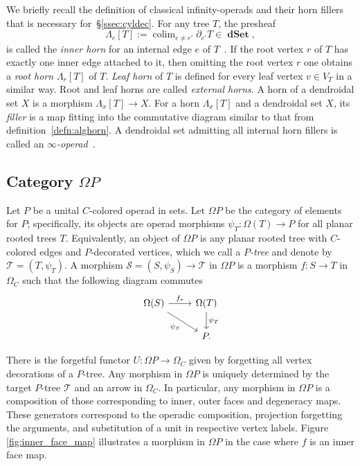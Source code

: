 \documentclass{amsart}
\theoremstyle{definition}
\theoremstyle{remark}
\DeclareMathOperator{\col}{colim}
\DeclareMathOperator{\dset}{\mathbf{dSet}}
\begin{document}
	We briefly recall the definition of classical infinity-operads and their horn fillers that is necessary for~\S\ref{ssec:cyldec}.
	For any tree $T$, the presheaf
	\begin{equation}\label{eq:colhornd}
		\Lambda_{e}[T]:=\col_{e\neq e'} \partial_{e'} T\in \dset,
	\end{equation}
	is called the \textit{inner horn} for an internal edge $e$ of $T$~\cite[\S 6]{he-mo-22}.
	If the root vertex $r$ of $T$ has exactly one inner edge attached to it, then omitting the root vertex $r$ one obtains a \textit{root horn} $\Lambda_{r} [T]$ of $T$.
	\textit{Leaf horn} of $T$ is defined for every leaf vertex $v\in V_T$ in a similar way.
	Root and leaf horns are called \textit{external horns}.
	A horn of a dendroidal set $X$ is a morphism $\Lambda_{x}[T]\to X$.
	For a horn $\Lambda_{x}[T]$ and a dendroidal set $X$, its \textit{filler} is a map fitting into the commutative diagram similar to that from definition~\ref{defn:alghorn}.
	A dendroidal set admitting all internal horn fillers is called an \textit{$\infty$-operad}~\cite{we-07}.

	\subsection{Category $\Omega P$}\label{ssec:ptrees}
	Let $P$ be a unital $C$-colored operad in sets.
	Let $\Omega P$ be the category of elements for $P$; specifically, its
	objects are operad morphisms $\psi_{T}\colon \Omega(T)\to P$ for all planar rooted trees $T$.
	Equivalently, an object of $\Omega P$ is any planar rooted tree with $C$-colored edges and $P$-decorated vertices, which we call a \emph{$P$-tree} and denote by $\mathcal{T}=(T,\psi_{T})$.
	A morphism $\mathcal{S}=(S,\psi_{S})\to\mathcal{T}$ in $\Omega P$ is a morphism $f\colon S\to T$ in $\Omega_{C}$ such that the following diagram commutes
	\begin{equation}
		\begin{tikzcd}
			\Omega(S) \arrow{r}{f_{*}}\arrow[swap]{rd}{\psi_{S}} & \Omega(T)\arrow{d}{\psi_{T}}\\
			& P.
		\end{tikzcd}
		\label{cd_mophism_omegaP}
	\end{equation}	
		
	There is the forgetful functor $U\colon \Omega P\to \Omega_{C}$ given by forgetting all vertex decorations of a $P$-tree.  
	Any morphism in $\Omega P$ is uniquely determined by the target $P$-tree $\mathcal{T}$ and an arrow in $\Omega_{C}$.
	In particular, any morphism in $\Omega P$ is a composition of those corresponding to 
	inner, outer faces and degeneracy maps.
	These generators correspond to the operadic composition, projection forgetting the arguments, and substitution of a unit in respective vertex labels.
	Figure \ref{fig:inner_face_map} illustrates a morphism in $\Omega P$ in the case where $f$ is an inner face map.
\end{document}
